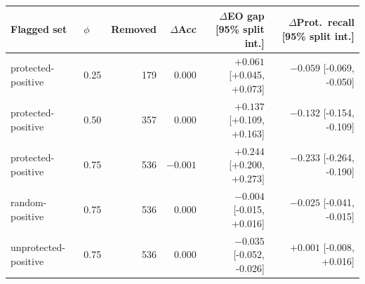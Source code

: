 \begin{tabular}{@{}llrrrr@{}}
\toprule
Flagged set & $\phi$ & Removed & $\Delta$Acc & $\Delta$EO gap [95\% split int.] & $\Delta$Prot.\ recall [95\% split int.] \\
\midrule
protected-positive & 0.25 & 179 & $0.000$ & $+0.061$ {\scriptsize[+0.045, +0.073]} & $-0.059$ {\scriptsize[-0.069, -0.050]} \\
protected-positive & 0.50 & 357 & $0.000$ & $+0.137$ {\scriptsize[+0.109, +0.163]} & $-0.132$ {\scriptsize[-0.154, -0.109]} \\
protected-positive & 0.75 & 536 & $-0.001$ & $+0.244$ {\scriptsize[+0.200, +0.273]} & $-0.233$ {\scriptsize[-0.264, -0.190]} \\
random-positive & 0.75 & 536 & $0.000$ & $-0.004$ {\scriptsize[-0.015, +0.016]} & $-0.025$ {\scriptsize[-0.041, -0.015]} \\
unprotected-positive & 0.75 & 536 & $0.000$ & $-0.035$ {\scriptsize[-0.052, -0.026]} & $+0.001$ {\scriptsize[-0.008, +0.016]} \\
\bottomrule
\end{tabular}
